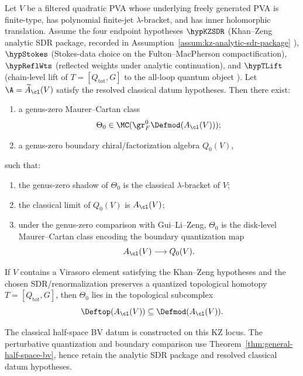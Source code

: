 \begin{theorem}\label{thm:kz-locus-tree}
Let $V$ be a filtered quadratic PVA whose underlying freely generated
PVA is finite-type, has polynomial finite-jet $\lambda$-bracket, and
has inner holomorphic translation. Assume the four endpoint
hypotheses
$\hypKZSDR$ (Khan--Zeng analytic SDR package, recorded in
Assumption~\ref{assum:kz-analytic-sdr-package} \cite{KZ25}),
$\hypStokes$ (Stokes-data choice on the Fulton--MacPherson
compactification),
$\hypReflWts$ (reflected weights under analytic continuation),
and $\hypTLift$ (chain-level lift of $T = [Q_{\mathrm{tot}}, G]$ to
the all-loop quantum object \cite{Costello2011Renorm,CG17,LurieHA}).
Let $\A=\widetilde A_{\cl}(V)$ satisfy the resolved classical datum
hypotheses. Then there exist:
\begin{enumerate}[leftmargin=2.4em]
\item a genus-zero Maurer--Cartan class
\[
\Theta_0\in \MC(\gr_F^0\Defmod(A_{\cl}(V)));
\]
\item a genus-zero boundary chiral/factorization algebra $Q_0(V)$,
\end{enumerate}
such that:
\begin{enumerate}[label=\textnormal{(\alph*)},leftmargin=2.8em]
\item the genus-zero shadow of $\Theta_0$ is the classical $\lambda$-bracket of $V$;
\item the classical limit of $Q_0(V)$ is $A_{\cl}(V)$;
\item under the genus-zero comparison with Gui--Li--Zeng, $\Theta_0$ is the disk-level
Maurer--Cartan class encoding the boundary quantization map
\[
A_{\cl}(V)\longrightarrow Q_0(V).
\]
\end{enumerate}
If $V$ contains a Virasoro element satisfying the Khan--Zeng
hypotheses and the chosen SDR/renormalization preserves a quantized
topological homotopy $T=[Q_{\mathrm{tot}},G]$, then $\Theta_0$ lies in
the topological subcomplex
\[
\Deftop(A_{\cl}(V))\subseteq \Defmod(A_{\cl}(V)).
\]
\end{theorem}

\begin{remark}
The classical half-space BV datum is constructed on this KZ locus.
The perturbative quantization and boundary comparison use
Theorem~\ref{thm:general-half-space-bv}, hence retain the analytic SDR
package and resolved classical datum hypotheses.
\end{remark}

